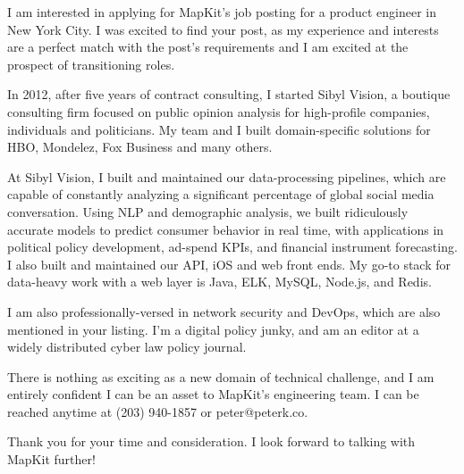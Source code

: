 \begin{cvletter}

I am interested in applying for MapKit's job posting for a product engineer in New York City. I was excited to find your post, as my experience and interests are a perfect match with the post's requirements and I am excited at the prospect of transitioning roles.

In 2012, after five years of contract consulting, I started Sibyl Vision, a boutique consulting firm focused on public opinion analysis for high-profile companies, individuals and politicians. My team and I built domain-specific solutions for HBO, Mondelez, Fox Business and many others.

At Sibyl Vision, I built and maintained our data-processing pipelines, which are capable of constantly analyzing a significant percentage of global social media conversation. Using NLP and demographic analysis, we built ridiculously accurate models to predict consumer behavior in real time, with applications in political policy development, ad-spend KPIs, and financial instrument forecasting. I also built and maintained our API, iOS and web front ends. My go-to stack for data-heavy work with a web layer is Java, ELK, MySQL, Node.js, and Redis.

I am also professionally-versed in network security and DevOps, which are also mentioned in your listing. I'm a digital policy junky, and am an editor at a widely distributed cyber law policy journal.

There is nothing as exciting as a new domain of technical challenge, and I am entirely confident I can be an asset to MapKit's engineering team. I can be reached anytime at (203) 940-1857 or peter@peterk.co.

Thank you for your time and consideration. I look forward to talking with MapKit further!

\end{cvletter}


\makeletterclosing


